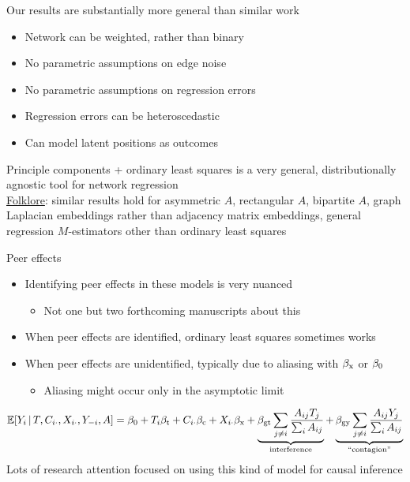 \documentclass[aspectratio=169]{beamer}
\theoremstyle{remark}
\begin{document}
\begin{frame}{Our results are substantially more general than similar work}

    \begin{itemize}
        \item Network can be weighted, rather than binary
        \item No parametric assumptions on edge noise
        \item No parametric assumptions on regression errors
        \item Regression errors can be heteroscedastic
        \item Can model latent positions as outcomes
    \end{itemize}

    Principle components + ordinary least squares is a very general, distributionally agnostic tool for network regression \\
    \vspace{2mm}
    \underline{Folklore}: similar results hold for asymmetric $A$, rectangular $A$, bipartite $A$, graph Laplacian embeddings rather than adjacency matrix embeddings, general regression $M$-estimators other than ordinary least squares
\end{frame}

\begin{frame}{Peer effects}
    \begin{itemize}
        \item Identifying peer effects in these models is very nuanced
              \begin{itemize}
                  \item Not one but two forthcoming manuscripts about this
              \end{itemize}
        \item When peer effects are identified, ordinary least squares sometimes works
        \item When peer effects are unidentified, typically due to aliasing with $\beta_\text{x}$ or $\beta_0$
              \begin{itemize}
                  \item Aliasing might occur only in the asymptotic limit
              \end{itemize}
    \end{itemize}
    \begin{equation*}
        \begin{aligned}
            \E[T, \C_{i \cdot}, \X_{i \cdot}, Y_{-i}, A]{Y_i}
            = \betazero + T_i \betat + \C_{i \cdot} \betac + \X_{i \cdot} \betax +
            \underbrace{\beta_\text{gt} \sum_{j \neq i} \frac{A_{ij} T_j}{\sum_i A_{ij}}}_\text{interference} +
            \underbrace{\beta_\text{gy} \sum_{j \neq i} \frac{A_{ij} Y_j}{\sum_i A_{ij}}}_\text{``contagion''}
        \end{aligned}
    \end{equation*}
    \vspace{2mm}
    Lots of research attention focused on using this kind of model for causal inference
\end{frame}
\end{document}
